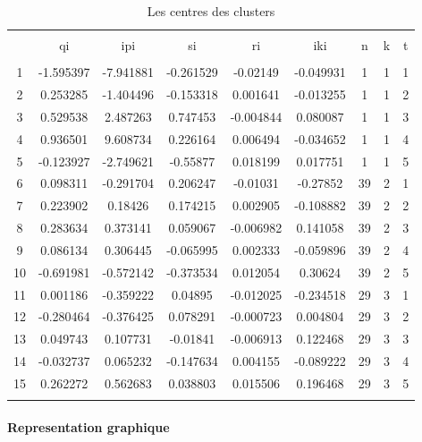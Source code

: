 \documentclass[11pt,]{article}
\let\oldparagraph\paragraph
\renewcommand{\paragraph}[1]{\oldparagraph{#1}\mbox{}}
\begin{document}
\begin{table}[!htbp] \centering 
  \caption{Les centres des clusters} 
  \label{} 
\begin{tabular}{@{\extracolsep{5pt}} ccccccccc} 
\\[-1.8ex]\hline 
\hline \\[-1.8ex] 
 & qi & ipi & si & ri & iki & n & k & t \\ 
\hline \\[-1.8ex] 
1 & -1.595397 & -7.941881 & -0.261529 & -0.02149 & -0.049931 & 1 & 1 & 1 \\ 
2 & 0.253285 & -1.404496 & -0.153318 & 0.001641 & -0.013255 & 1 & 1 & 2 \\ 
3 & 0.529538 & 2.487263 & 0.747453 & -0.004844 & 0.080087 & 1 & 1 & 3 \\ 
4 & 0.936501 & 9.608734 & 0.226164 & 0.006494 & -0.034652 & 1 & 1 & 4 \\ 
5 & -0.123927 & -2.749621 & -0.55877 & 0.018199 & 0.017751 & 1 & 1 & 5 \\ 
6 & 0.098311 & -0.291704 & 0.206247 & -0.01031 & -0.27852 & 39 & 2 & 1 \\ 
7 & 0.223902 & 0.18426 & 0.174215 & 0.002905 & -0.108882 & 39 & 2 & 2 \\ 
8 & 0.283634 & 0.373141 & 0.059067 & -0.006982 & 0.141058 & 39 & 2 & 3 \\ 
9 & 0.086134 & 0.306445 & -0.065995 & 0.002333 & -0.059896 & 39 & 2 & 4 \\ 
10 & -0.691981 & -0.572142 & -0.373534 & 0.012054 & 0.30624 & 39 & 2 & 5 \\ 
11 & 0.001186 & -0.359222 & 0.04895 & -0.012025 & -0.234518 & 29 & 3 & 1 \\ 
12 & -0.280464 & -0.376425 & 0.078291 & -0.000723 & 0.004804 & 29 & 3 & 2 \\ 
13 & 0.049743 & 0.107731 & -0.01841 & -0.006913 & 0.122468 & 29 & 3 & 3 \\ 
14 & -0.032737 & 0.065232 & -0.147634 & 0.004155 & -0.089222 & 29 & 3 & 4 \\ 
15 & 0.262272 & 0.562683 & 0.038803 & 0.015506 & 0.196468 & 29 & 3 & 5 \\ 
\hline \\[-1.8ex] 
\end{tabular} 
\end{table}

\FloatBarrier

\hypertarget{representation-graphique-1}{%
\paragraph{Representation graphique}\label{representation-graphique-1}}
\end{document}
